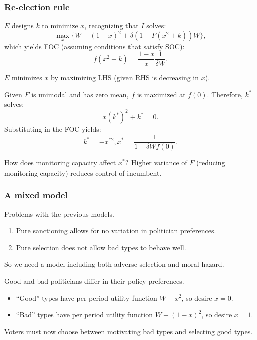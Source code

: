 \documentclass[10pt]{beamer}
\begin{document}
\begin{frame}

\frametitle{Re-election rule}

\small 

$E$ designs $k$ to minimize $x$, recognizing that $I$ solves: $$\max_{x} \bigg\{ W - (1-x)^2 + \delta(1-F(x^2+k))W \bigg\},$$ which yields FOC (assuming conditions that satisfy SOC): $$ f(x^2+k) = \frac{1-x}{x}\frac{1}{\delta W}.$$

$E$ minimizes $x$ by maximizing LHS (given RHS is decreasing in $x$). 

Given $F$ is unimodal and has zero mean, $f$ is maximized at $f(0)$. Therefore, $k^*$ solves: $$x(k^*)^2 + k^* = 0.$$ Substituting in the FOC yields: $$k^* = -x^{*2}, x^* = \frac{1}{1 - \delta Wf(0)}.$$ 

How does monitoring capacity affect $x^*$? \pause Higher variance of $F$ (reducing monitoring capacity) reduces control of incumbent.

\end{frame}

\begin{frame}

\frametitle{A mixed model}

Problems with the previous models.
\begin{enumerate}
\item Pure sanctioning allows for no variation in politician preferences. 
\item Pure selection does not allow bad types to behave well. 
\end{enumerate}

So we need a model including both adverse selection and moral hazard. 

\bigskip

Good and bad politicians differ in their policy preferences. 

\begin{itemize}
\item ``Good'' types have per period utility function $W-x^2$, so desire $x=0$. 
\item ``Bad'' types have per period utility function $W-(1-x)^2$, so desire $x=1$. 
\end{itemize}

Voters must now choose between motivating bad types and selecting good types. 

\end{frame}
\end{document}

